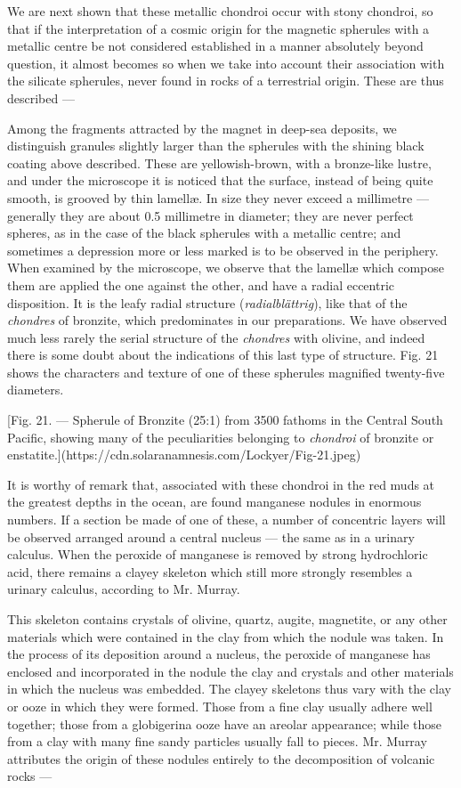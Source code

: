 \documentclass[a4paper, 12pt, oneside, polutonikogreek, english]{article}
\begin{document}
We are next shown that these metallic chondroi occur with stony chondroi, so that if the interpretation of a cosmic origin for the magnetic spherules with a metallic centre be not considered established in a manner absolutely beyond question, it almost becomes so when we take into account their association with the silicate spherules, never found in rocks of a terrestrial origin. These are thus described ---

Among the fragments attracted by the magnet in deep-sea deposits, we distinguish granules slightly larger than the spherules with the shining black coating above described. These are yellowish-brown, with a bronze-like lustre, and under the microscope it is noticed that the surface, instead of being quite smooth, is grooved by thin lamellæ. In size they never exceed a millimetre --- generally they are about 0.5 millimetre in diameter; they are never perfect spheres, as in the case of the black spherules with a metallic centre; and sometimes a depression more or less marked is to be observed in the periphery. When examined by the microscope, we observe that the lamellæ which compose them are applied the one against the other, and have a radial eccentric disposition. It is the leafy radial structure (\emph{radialblättrig}), like that of the \emph{chondres} of bronzite, which predominates in our preparations. We have observed much less rarely the serial structure of the \emph{chondres} with olivine, and indeed there is some doubt about the indications of this last type of structure. Fig. 21 shows the characters and texture of one of these spherules magnified twenty-five diameters.

[Fig. 21. --- Spherule of Bronzite (25:1) from 3500 fathoms in the Central South Pacific, showing many of the peculiarities belonging to \emph{chondroi} of bronzite or enstatite.](https://cdn.solaranamnesis.com/Lockyer/Fig-21.jpeg)

It is worthy of remark that, associated with these chondroi in the red muds at the greatest depths in the ocean, are found manganese nodules in enormous numbers. If a section be made of one of these, a number of concentric layers will be observed arranged around a central nucleus --- the same as in a urinary calculus. When the peroxide of manganese is removed by strong hydrochloric acid, there remains a clayey skeleton which still more strongly resembles a urinary calculus, according to Mr. Murray.

This skeleton contains crystals of olivine, quartz, augite, magnetite, or any other materials which were contained in the clay from which the nodule was taken. In the process of its deposition around a nucleus, the peroxide of manganese has enclosed and incorporated in the nodule the clay and crystals and other materials in which the nucleus was embedded. The clayey skeletons thus vary with the clay or ooze in which they were formed. Those from a fine clay usually adhere well together; those from a globigerina ooze have an areolar appearance; while those from a clay with many fine sandy particles usually fall to pieces. Mr. Murray attributes the origin of these nodules entirely to the decomposition of volcanic rocks ---
\end{document}
